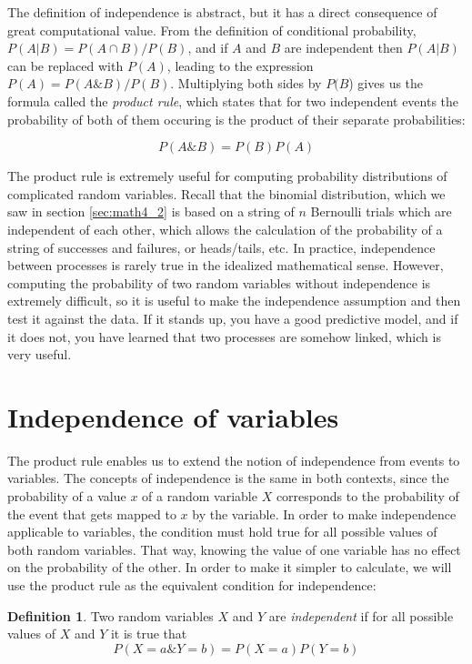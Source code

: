 \documentclass[
]{book}
\theoremstyle{definition}
\newtheorem{definition}{Definition}[chapter]
\theoremstyle{definition}
\theoremstyle{definition}
\theoremstyle{remark}
\begin{document}
The definition of independence is abstract, but it has a direct consequence of great computational value. From the definition of conditional probability, \(P(A|B) = P(A\cap B)/P(B)\), and if \(A\) and \(B\) are independent then \(P(A|B)\) can be replaced with \(P(A)\), leading to the expression \(P(A) = P(A\& B)/P(B)\). Multiplying both sides by \(P(B\)) gives us the formula called the \emph{product rule}, which states that for two independent events the probability of both of them occuring is the product of their separate probabilities:

\[
P(A \& B) = P(B)P(A)
\]

The product rule is extremely useful for computing probability distributions of complicated random variables. Recall that the binomial distribution, which we saw in section \ref{sec:math4_2} is based on a string of \(n\) Bernoulli trials which are independent of each other, which allows the calculation of the probability of a string of successes and failures, or heads/tails, etc. In practice, independence between processes is rarely true in the idealized mathematical sense. However, computing the probability of two random variables without independence is extremely difficult, so it is useful to make the independence assumption and then test it against the data. If it stands up, you have a good predictive model, and if it does not, you have learned that two processes are somehow linked, which is very useful.

\hypertarget{independence-of-variables}{%
\section{Independence of variables}\label{independence-of-variables}}

The product rule enables us to extend the notion of independence from events to variables. The concepts of independence is the same in both contexts, since the probability of a value \(x\) of a random variable \(X\) corresponds to the probability of the event that gets mapped to \(x\) by the variable. In order to make independence applicable to variables, the condition must hold true for all possible values of both random variables. That way, knowing the value of one variable has no effect on the probability of the other. In order to make it simpler to calculate, we will use the product rule as the equivalent condition for independence:

\begin{definition}
\protect\hypertarget{def:def-indep-var}{}{\label{def:def-indep-var} }Two random variables \(X\) and \(Y\) are \emph{independent} if for all possible values of \(X\) and \(Y\) it is true that
\[ P(X=a  \& Y=b) = P(X=a)P(Y=b)\]
\end{definition}
\end{document}
